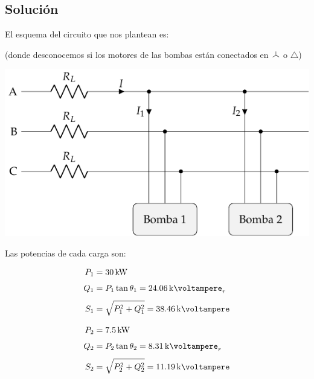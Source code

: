 \vspace{3mm}

\subsection*{Solución}

\begin{minipage}{0.32\linewidth}         
    
    \vspace{-5mm}

    El esquema del circuito que nos plantean es:

    \vspace{8mm}
    (donde desconocemos si los motores de las bombas están conectados en $\wye$ o $\triangle$)    
\end{minipage}
\hfill%
\begin{minipage}{0.6\linewidth}  

    \vspace{-3mm}
    \begin{center}
        \includegraphics[width=1\textwidth]{figuras/BT3_ej5_bombas.pdf}
    \end{center}   
\end{minipage}

\vspace{4mm}
 Las potencias de cada carga son:

\vspace{-2mm}
\begin{minipage}{0.5\linewidth}         
    \begin{align*}
        P_1 &= \SI{30}{\kilo\watt}\\[4pt]
        Q_1 &= P_1\tan \theta_1 = \SI{24.06}{\kilo\voltampere}_r\\[4pt]
        S_1 &= \sqrt{P_1^2 + Q_1^2} = \SI{38.46}{\kilo\voltampere}
    \end{align*}   
\end{minipage}
\hfill%
\begin{minipage}{0.5\linewidth}  
    \begin{align*}
        P_2 &= \SI{7.5}{\kilo\watt}\\[4pt]
        Q_2 &= P_2 \tan \theta_2 = \SI{8.31}{\kilo\voltampere}_r\\[4pt]
        S_2 &= \sqrt{P_2^2 + Q_2^2} = \SI{11.19}{\kilo\voltampere}
    \end{align*} 
\end{minipage}

